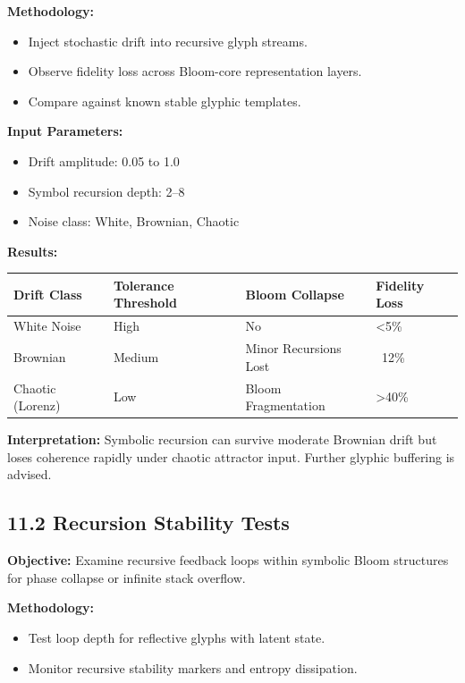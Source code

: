 \textbf{Methodology:}
\begin{itemize}
  \item Inject stochastic drift into recursive glyph streams.
  \item Observe fidelity loss across Bloom-core representation layers.
  \item Compare against known stable glyphic templates.
\end{itemize}

\textbf{Input Parameters:}
\begin{itemize}
  \item Drift amplitude: 0.05 to 1.0
  \item Symbol recursion depth: 2–8
  \item Noise class: White, Brownian, Chaotic
\end{itemize}

\textbf{Results:}
\begin{center}
\begin{tabular}{@{}llll@{}}
\toprule
\textbf{Drift Class} & \textbf{Tolerance Threshold} & \textbf{Bloom Collapse} & \textbf{Fidelity Loss} \\
\midrule
White Noise & High & No & <5\% \\
Brownian & Medium & Minor Recursions Lost & ~12\% \\
Chaotic (Lorenz) & Low & Bloom Fragmentation & >40\% \\
\bottomrule
\end{tabular}
\end{center}

\textbf{Interpretation:} Symbolic recursion can survive moderate Brownian drift but loses coherence rapidly under chaotic attractor input. Further glyphic buffering is advised.

\subsection*{11.2 Recursion Stability Tests}
\textbf{Objective:} Examine recursive feedback loops within symbolic Bloom structures for phase collapse or infinite stack overflow.

\textbf{Methodology:}
\begin{itemize}
  \item Test loop depth for reflective glyphs with latent state.
  \item Monitor recursive stability markers and entropy dissipation.
\end{itemize}

